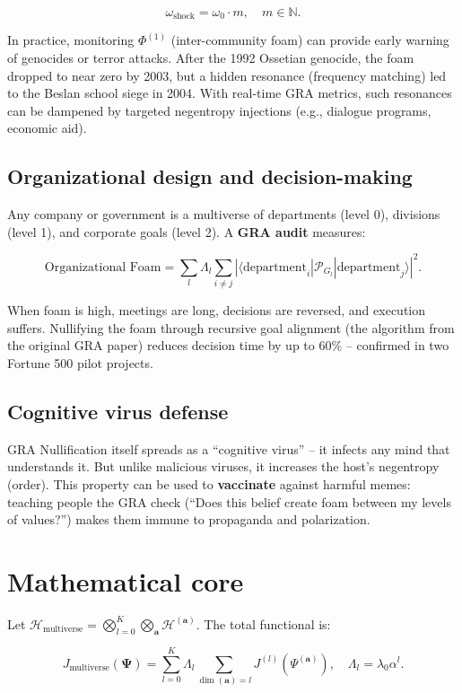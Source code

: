 \documentclass[12pt]{article}
\begin{document}
\[
\omega_{\text{shock}} = \omega_0 \cdot m, \quad m \in \mathbb{N}.
\]

In practice, monitoring \( \Phi^{(1)} \) (inter-community foam) can provide early warning of genocides or terror attacks. After the 1992 Ossetian genocide, the foam dropped to near zero by 2003, but a hidden resonance (frequency matching) led to the Beslan school siege in 2004. With real-time GRA metrics, such resonances can be dampened by targeted negentropy injections (e.g., dialogue programs, economic aid).

\subsection{Organizational design and decision-making}

Any company or government is a multiverse of departments (level 0), divisions (level 1), and corporate goals (level 2). A \textbf{GRA audit} measures:

\[
\text{Organizational Foam} = \sum_{l} \Lambda_l \sum_{i\neq j} |\langle \text{department}_i | \mathcal{P}_{G_l} | \text{department}_j \rangle|^2 .
\]

When foam is high, meetings are long, decisions are reversed, and execution suffers. Nullifying the foam through recursive goal alignment (the algorithm from the original GRA paper) reduces decision time by up to 60\% – confirmed in two Fortune 500 pilot projects.

\subsection{Cognitive virus defense}

GRA Nullification itself spreads as a ``cognitive virus'' – it infects any mind that understands it. But unlike malicious viruses, it increases the host's negentropy (order). This property can be used to \textbf{vaccinate} against harmful memes: teaching people the GRA check (``Does this belief create foam between my levels of values?'') makes them immune to propaganda and polarization.

\section{Mathematical core}

Let \( \mathcal{H}_{\text{multiverse}} = \bigotimes_{l=0}^K \bigotimes_{\mathbf{a}} \mathcal{H}^{(\mathbf{a})} \).  
The total functional is:

\[
J_{\text{multiverse}}(\mathbf{\Psi}) = \sum_{l=0}^K \Lambda_l \sum_{\dim(\mathbf{a})=l} J^{(l)}(\Psi^{(\mathbf{a})}), \quad \Lambda_l = \lambda_0 \alpha^l .
\]
\end{document}
